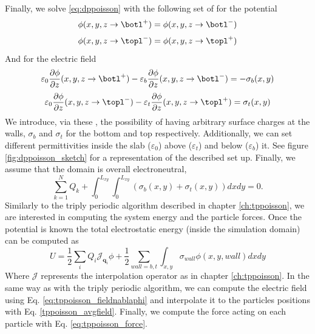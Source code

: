 \documentclass[twoside,openright,titlepage,numbers=noenddot,%
headinclude,footinclude,cleardoublepage=empty,abstract=on,
BCOR=5mm,fontsize=11pt, dvipsnames, paper=b5
]{scrreprt}
\renewcommand{\vec}[1]{\bm{#1}}
\newcommand{\oper}[1]{\mathcal{#1}}
\begin{document}
Finally, we solve \eqref{eq:dppoisson} with the following set of \bcs for the potential
\begin{equation}\phi(x,y,z\rightarrow \botl^+)=\phi(x,y,z\rightarrow \botl^-)\label{eq:dppoissonbcs1}\end{equation}  
\begin{equation}\phi(x,y,z\rightarrow \topl^-)=\phi(x,y,z\rightarrow \topl^+)\label{eq:dppoissonbcs2}\end{equation}
And for the electric field 
\begin{equation}\varepsilon_0 \frac{\partial \phi}{\partial z}(x,y,z\rightarrow \botl^+)-\varepsilon_b \frac{\partial \phi}{\partial z}(x,y,z\rightarrow \botl^-)=-\sigma_b(x,y)\label{eq:dppoissonbcs3}\end{equation}  
\begin{equation}\varepsilon_0 \frac{\partial \phi}{\partial z}(x,y,z\rightarrow \topl^-)-\varepsilon_t \frac{\partial \phi}{\partial z}(x,y,z\rightarrow \topl^+)=\sigma_t(x,y)\label{eq:dppoissonbcs4}\end{equation} 
We introduce, via these \bcs, the possibility of having arbitrary surface charges at the walls, $\sigma_b$ and $\sigma_t$ for the bottom and top respectively. Additionally, we can set different permittivities inside the slab ($\varepsilon_0$) above ($\varepsilon_t$) and below ($\varepsilon_b$) it. See figure \ref{fig:dppoisson_sketch} for a representation of the described set up.
Finally, we assume that the domain is overall electroneutral,
\begin{equation}
  \label{eq:dppoisson_electroneutral}
  \sum_{k=1}^N{Q_k} + \int_0^{L_{xy}}{\int_0^{L_{xy}}{(\sigma_b(x,y) + \sigma_t(x,y))dx dy}} = 0.
\end{equation}
Similarly to the triply periodic algorithm described in chapter \ref{ch:tppoisson}, we are interested in computing the system energy and the particle forces.
Once the potential is known the total electrostatic energy (inside the simulation domain) can be computed as
\begin{equation}
  \label{eq:dppu}
  U = \frac{1}{2}\sum_i{Q_i\oper{J}_{\vec{q}_i}\phi} + \frac{1}{2}\sum_{wall=b,t}{\int_{x,y}{\sigma_{wall}\phi(x,y,wall)dx dy}}
\end{equation}
Where $\oper{J}$ represents the interpolation operator as in chapter \ref{ch:tppoisson}.
In the same way as with the triply periodic algorithm, we can compute the electric field using Eq. \eqref{eq:tppoisson_fieldnablaphi} and interpolate it to the particles positions with Eq. \eqref{tppoisson_avgfield}. Finally, we compute the force acting on each particle with Eq. \eqref{eq:tppoisson_force}.
\end{document}
